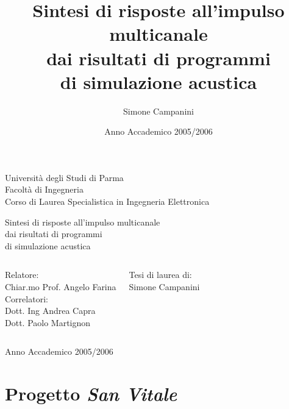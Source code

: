 \documentclass[10pt]{beamer}
\title[Sintesi di risposte all'impulso multicanale]{Sintesi di risposte all'impulso multicanale\\ dai risultati di programmi\\ di simulazione acustica\\}
\author[S. Campanini]{Simone Campanini}
\institute{}
\date{Anno Accademico 2005/2006}
\begin{document}

\begin{frame}


  \begin{center}
    \large Universit\`a degli Studi di Parma \\ 
    \vskip 0.1cm
    \large Facolt\`a di Ingegneria\\
    \vskip 0.3cm
    \small Corso di Laurea Specialistica in Ingegneria Elettronica
    \vskip 0.4cm
    \begin{block}{}
      \begin{center}
      Sintesi di risposte all'impulso multicanale\\ dai risultati di programmi\\ di simulazione acustica\\ 
      \end{center}
    \end{block}

    \vskip 0.5cm
    \begin{columns}
      \column{6cm}
      \small
      Relatore:\\
      Chiar.mo Prof. Angelo Farina\\
      \vskip 0.2cm
      Correlatori:\\
      Dott. Ing Andrea Capra\\
      Dott. Paolo Martignon
      
      \column{4cm}
      \small
      Tesi di laurea di:\\
      Simone Campanini
    \end{columns}
    \vskip 0.8cm
    
    Anno Accademico 2005/2006
  \end{center}
\end{frame}

\section{Progetto \em San Vitale}
\end{document}
